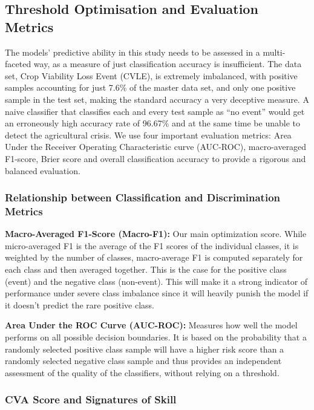 \documentclass{ieeeaccess}
\begin{document}
\subsection{Threshold Optimisation and Evaluation Metrics}

The models' predictive ability in this study needs to be assessed in a multi-faceted way, as a measure of just classification accuracy is insufficient. The data set, Crop Viability Loss Event (CVLE), is extremely imbalanced, with positive samples accounting for just 7.6\% of the master data set, and only one positive sample in the test set, making the standard accuracy a very deceptive measure. A naive classifier that classifies each and every test sample as ``no event'' would get an erroneously high accuracy rate of 96.67\% and at the same time be unable to detect the agricultural crisis. We use four important evaluation metrics: Area Under the Receiver Operating Characteristic curve (AUC-ROC), macro-averaged F1-score, Brier score and overall classification accuracy to provide a rigorous and balanced evaluation.

\subsubsection{Relationship between Classification and Discrimination Metrics}

\textbf{Macro-Averaged F1-Score (Macro-F1):} Our main optimization score. While micro-averaged F1 is the average of the F1 scores of the individual classes, it is weighted by the number of classes, macro-average F1 is computed separately for each class and then averaged together. This is the case for the positive class (event) and the negative class (non-event). This will make it a strong indicator of performance under severe class imbalance since it will heavily punish the model if it doesn't predict the rare positive class.

\textbf{Area Under the ROC Curve (AUC-ROC):} Measures how well the model performs on all possible decision boundaries. It is based on the probability that a randomly selected positive class sample will have a higher risk score than a randomly selected negative class sample and thus provides an independent assessment of the quality of the classifiers, without relying on a threshold.

\subsubsection{CVA Score and Signatures of Skill}
\end{document}
